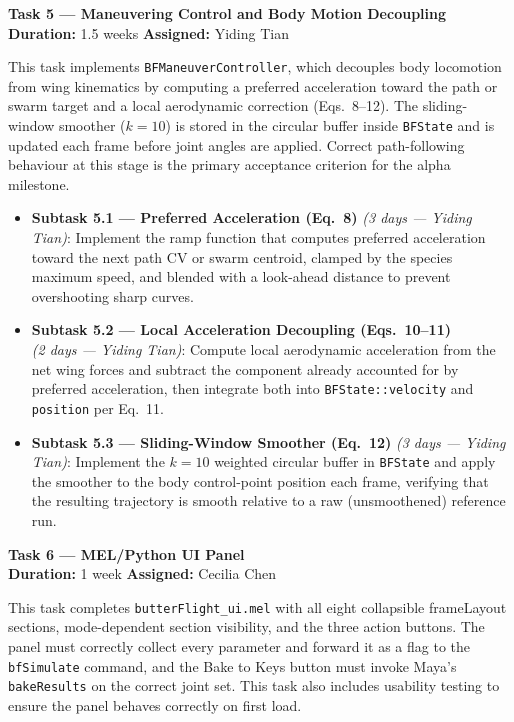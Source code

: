 \documentclass[12pt]{article}
\begin{document}
\bigskip
\noindent\textbf{Task 5 --- Maneuvering Control and Body Motion Decoupling}\\
\textbf{Duration:} 1.5 weeks \quad \textbf{Assigned:} Yiding Tian

This task implements \texttt{BFManeuverController}, which decouples body locomotion
from wing kinematics by computing a preferred acceleration toward the path or swarm
target and a local aerodynamic correction (Eqs.~8--12). The sliding-window smoother
($k=10$) is stored in the circular buffer inside \texttt{BFState} and is updated
each frame before joint angles are applied. Correct path-following behaviour at this
stage is the primary acceptance criterion for the alpha milestone.

\begin{itemize}
  \item \textbf{Subtask 5.1 --- Preferred Acceleration (Eq.~8)} \textit{(3 days --- Yiding Tian)}: Implement the
    ramp function that computes preferred acceleration toward the next path CV or
    swarm centroid, clamped by the species maximum speed, and blended with a look-ahead
    distance to prevent overshooting sharp curves.
  \item \textbf{Subtask 5.2 --- Local Acceleration Decoupling (Eqs.~10--11)}\\
    \textit{(2 days --- Yiding Tian)}:
    Compute local aerodynamic acceleration from the net wing forces and subtract
    the component already accounted for by preferred acceleration, then integrate
    both into \texttt{BFState::velocity} and \texttt{position} per Eq.~11.
  \item \textbf{Subtask 5.3 --- Sliding-Window Smoother (Eq.~12)} \textit{(3 days --- Yiding Tian)}: Implement the
    $k=10$ weighted circular buffer in \texttt{BFState} and apply the smoother to
    the body control-point position each frame, verifying that the resulting
    trajectory is smooth relative to a raw (unsmoothened) reference run.
\end{itemize}

\bigskip
\noindent\textbf{Task 6 --- MEL/Python UI Panel}\\
\textbf{Duration:} 1 week \quad \textbf{Assigned:} Cecilia Chen

This task completes \texttt{butterFlight\_ui.mel} with all eight collapsible
frameLayout sections, mode-dependent section visibility,
and the three action buttons. The panel must correctly collect every parameter and
forward it as a flag to the \texttt{bfSimulate} command, and the Bake to Keys button
must invoke Maya's \texttt{bakeResults} on the correct joint set. This task also
includes usability testing to ensure the panel behaves correctly on first load.
\end{document}

